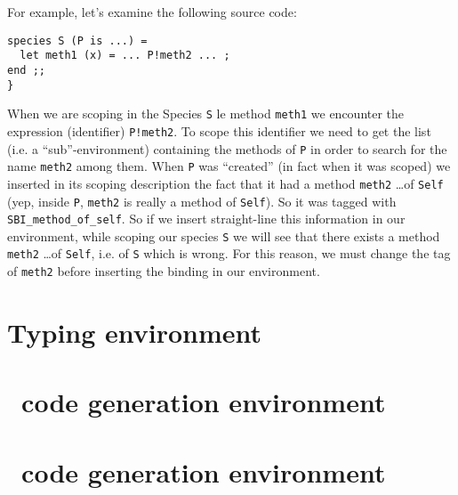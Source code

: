 For example, let's examine the following source code:
{\scriptsize
\begin{lstlisting}[language=MyOCaml]
species S (P is ...) =
  let meth1 (x) = ... P!meth2 ... ;
end ;;
}
\end{lstlisting}
}
When we are scoping in the Species {\tt S} le method {\tt meth1} we
encounter the expression (identifier) {\tt P!meth2}. To scope this
identifier we need to get the list (i.e. a ``sub''-environment)
containing the methods of {\tt P} in order to search for the name
{\tt meth2} among them. When {\tt P} was ``created'' (in fact when it
was scoped) we inserted in its scoping description the fact that it
had a method {\tt meth2} \ldots of {\tt Self} (yep, inside {\tt P},
{\tt meth2} is really a method of {\tt Self}). So it was tagged with
{\tt SBI\_method\_of\_self}. So if we insert straight-line this
information in our environment, while scoping our species {\tt S} we
will see that there exists a method {\tt meth2} \ldots of {\tt Self},
i.e. of {\tt S} which is wrong. For this reason, we must change the
tag of {\tt meth2} before inserting the binding in our environment.



\section{Typing environment}

\section{\ocaml\ code generation environment}

\section{\coq\ code generation environment}
